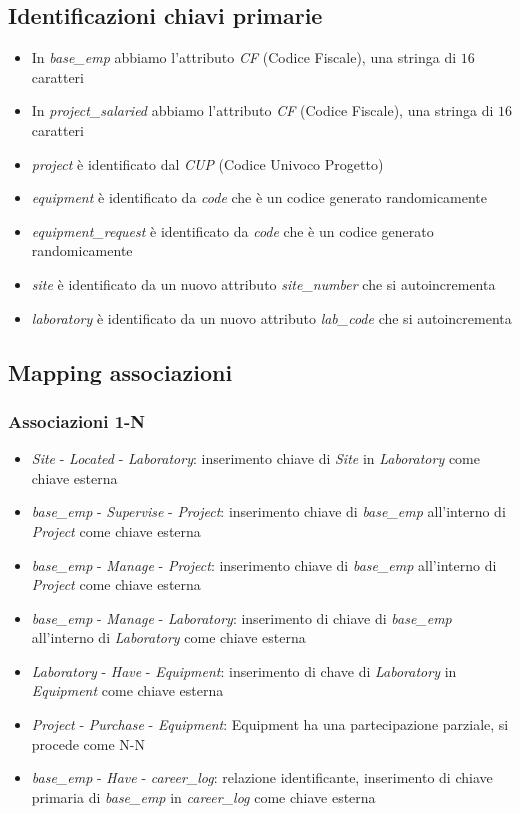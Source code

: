 \subsection{Identificazioni chiavi primarie}
\begin{itemize}
	\item In \textit{base\_emp} abbiamo l'attributo \textit{CF} (Codice Fiscale), una stringa di $16$ caratteri
	\item In \textit{project\_salaried} abbiamo l'attributo \textit{CF} (Codice Fiscale), una stringa di $16$ caratteri
	\item \textit{project} è identificato dal \textit{CUP} (Codice Univoco Progetto)
	\item \textit{equipment} è identificato da \textit{code} che è un codice generato randomicamente
	\item \textit{equipment\_request} è identificato da \textit{code} che è un codice generato randomicamente
	\item \textit{site} è identificato da un nuovo attributo \textit{site\_number} che si autoincrementa
	\item \textit{laboratory} è identificato da un nuovo attributo \textit{lab\_code} che si autoincrementa
\end{itemize}
\newpage
\subsection{Mapping associazioni}
\subsubsection{Associazioni 1-N}
\begin{itemize}
	\item \textit{Site} - \textit{Located} - \textit{Laboratory}:  inserimento chiave di \textit{Site} in \textit{Laboratory} come chiave esterna
	\item \textit{base\_emp} - \textit{Supervise} - \textit{Project}: inserimento chiave di \textit{base\_emp} all'interno di \textit{Project} come chiave esterna
	\item \textit{base\_emp} - \textit{Manage} - \textit{Project}: inserimento chiave di \textit{base\_emp} all'interno di \textit{Project} come chiave esterna
	\item \textit{base\_emp} - \textit{Manage} - \textit{Laboratory}: inserimento di chiave di \textit{base\_emp} all'interno di \textit{Laboratory} come chiave esterna
	\item \textit{Laboratory} - \textit{Have} - \textit{Equipment}: inserimento di chave di \textit{Laboratory} in \textit{Equipment} come chiave esterna
	\item \textit{Project} - \textit{Purchase} - \textit{Equipment}: Equipment ha una partecipazione parziale, si procede come N-N
	\item \textit{base\_emp} - \textit{Have} - \textit{career\_log}: relazione identificante, inserimento di chiave primaria di \textit{base\_emp} in \textit{career\_log} come chiave esterna
\end{itemize}
